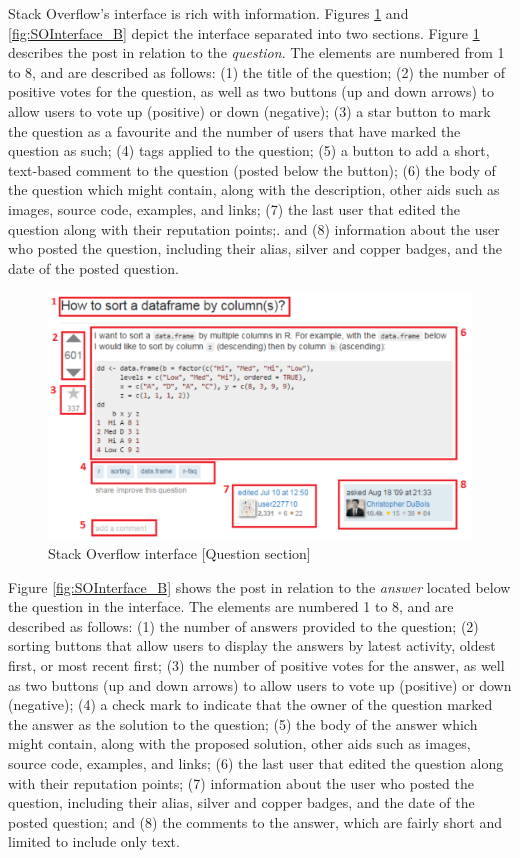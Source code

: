 \documentclass{sig-alternate-05-2015}
\begin{document}
	Stack Overflow's interface is rich with information. Figures \ref{fig:SOInterface_A} and \ref{fig:SOInterface_B} depict the interface separated into two sections. Figure \ref{fig:SOInterface_A} describes the post in relation to the \textit{question}. 
	The elements are numbered from 1 to 8, and are described as follows:
	(1) the title of the question;
	(2) the number of positive votes for the question, as well as two buttons (up and down arrows) to allow users to vote up (positive) or down (negative);
	(3) a star button to mark the question as a favourite and the number of users that have marked the question as such;
	(4) tags applied to the question;
	(5) a button to add a short, text-based comment to the question (posted below the button);
	(6) the body of the question which might contain, along with the description, other aids such as images, source code, examples, and links;
	(7) the last user that edited the question along with their reputation points;.
	and (8) information about the user who posted the question, including their alias, silver and copper badges, and the date of the posted question.

	\begin{figure}[!htb]
	\centering
	\includegraphics[width=0.8\columnwidth]{Figures/SOInterface_A}
	\caption{Stack Overflow interface [Question section]}
	\label{fig:SOInterface_A}
	\end{figure}

	Figure \ref{fig:SOInterface_B} shows the post in relation to the \textit{answer} located below the question in the interface.
	The elements are numbered 1 to 8, and are described as follows:
	(1) the number of answers provided to the question;
	(2) sorting buttons that allow users to display the answers by latest activity, oldest first, or most recent first;
	(3) the number of positive votes for the answer, as well as two buttons (up and down arrows) to allow users to vote up (positive) or down (negative);
	(4) a check mark to indicate that the owner of the question marked the answer as the solution to the question;
	(5) the body of the answer which might contain, along with the proposed solution, other aids such as images, source code, examples, and links;
	(6)	the last user that edited the question along with their reputation points;
	(7) information about the user who posted the question, including their alias, silver and copper badges, and the date of the posted question;
	and (8) the comments to the answer, which are fairly short and limited to include only text.
\end{document}
